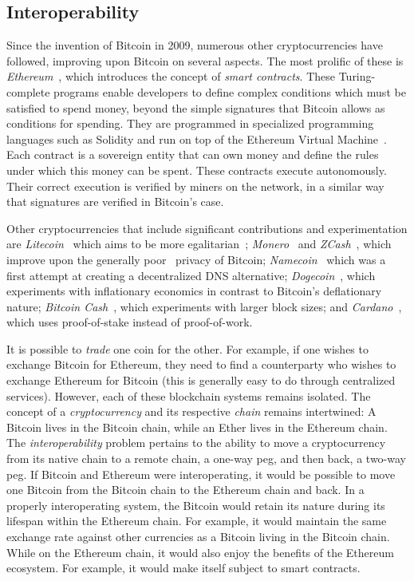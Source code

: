 \subsection{Interoperability}
Since the invention of Bitcoin in 2009, numerous other cryptocurrencies have
followed, improving upon Bitcoin on several aspects. The most prolific of these
is \emph{Ethereum}~\cite{buterin}, which introduces the concept of \emph{smart
contracts}. These Turing-complete programs enable developers to define complex
conditions which must be satisfied to spend money, beyond the simple signatures
that Bitcoin allows as conditions for spending. They are programmed in
specialized programming languages such as Solidity and run on top of the
Ethereum Virtual Machine~\cite{wood}. Each contract is a sovereign entity that
can own money and define the rules under which this money can be spent. These
contracts execute autonomously. Their correct execution is verified by miners on
the network, in a similar way that signatures are verified in Bitcoin's case.

Other cryptocurrencies that include significant contributions and
experimentation are \emph{Litecoin}~\cite{litecoin} which aims to be more
egalitarian~\cite{egalitarianism}; \emph{Monero}~\cite{cryptonote} and
\emph{ZCash}~\cite{zerocoin,zcash}, which improve upon the generally
poor~\cite{fistful,quantitative-bitcoin-analysis,tumblebit} privacy of
Bitcoin; \emph{Namecoin}~\cite{namecoin} which was a first attempt at creating a
decentralized DNS alternative; \emph{Dogecoin}~\cite{dogecoin}, which experiments with
inflationary economics in contrast to Bitcoin's deflationary nature;
\emph{Bitcoin Cash}~\cite{btcVSbch}, which experiments with larger block sizes; and
\emph{Cardano}~\cite{ouroboros}, which uses proof-of-stake instead of proof-of-work.

It is possible to \emph{trade} one coin for the other. For example, if one
wishes to exchange Bitcoin for Ethereum, they need to find a counterparty who
wishes to exchange Ethereum for Bitcoin (this is generally easy to do through
centralized services). However, each of these blockchain systems remains
isolated. The concept of a \emph{cryptocurrency} and its respective \emph{chain}
remains intertwined: A Bitcoin lives in the Bitcoin chain, while an Ether lives
in the Ethereum chain. The \emph{interoperability} problem pertains to the
ability to move a cryptocurrency from its native chain to a remote chain,
a one-way peg, and then back, a two-way
peg. If Bitcoin and Ethereum were interoperating, it would be
possible to move one Bitcoin from the Bitcoin chain to the Ethereum chain and
back. In a properly interoperating system, the Bitcoin would retain its nature
during its lifespan within the Ethereum chain. For example, it would maintain
the same exchange rate against other currencies as a Bitcoin living in the
Bitcoin chain. While on the Ethereum chain, it would also enjoy the benefits of
the Ethereum ecosystem. For example, it would make itself subject to smart
contracts.

